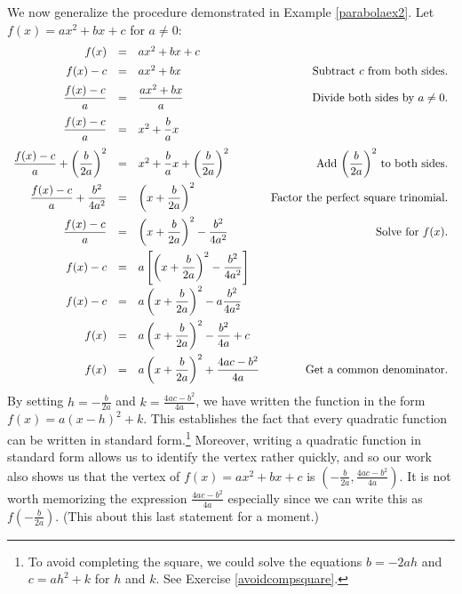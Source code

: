 
We now generalize the procedure demonstrated in Example \ref{parabolaex2}.  Let $f(x) = ax^2 + bx + c$ for $a \neq 0$: \[ \begin{array}{rclr}

f(x) & = & ax^2 + bx +c \\ [5pt]
f(x) - c & = &  ax^2 + bx & \text{Subtract $c$ from both sides.}\\ [5pt]
\dfrac{f(x)-c}{a}    & =  & \dfrac{ax^2 + bx}{a} &  \text{Divide both sides by $a \neq 0$.} \\ [10pt]
\dfrac{f(x)-c}{a}    & =  & x^2 + \dfrac{b}{a} x  & \\ [10pt]
\dfrac{f(x)-c}{a} + \left(\dfrac{b}{2a}\right)^2   & = & x^2 + \dfrac{b}{a} x + \left(\dfrac{b}{2a}\right)^2  & \text{Add $ \left(\dfrac{b}{2a}\right)^2  $ to both sides.}\\ [10pt]
\dfrac{f(x)-c}{a}  + \dfrac{b^2}{4a^2}    & = & \left(x + \dfrac{b}{2a}\right)^2  & \text{Factor the perfect square trinomial.} \\ [10pt]
\dfrac{f(x)-c}{a}    & =  & \left(x + \dfrac{b}{2a}\right)^2   -  \dfrac{b^2}{4a^2} & \text{Solve for $f(x)$.}\\ [10pt]
f(x)-c & = & a \left[ \left(x + \dfrac{b}{2a}\right)^2   -  \dfrac{b^2}{4a^2}\right] & \\ [10pt]
f(x)-c & = & a\left(x + \dfrac{b}{2a}\right)^2   -  a\dfrac{b^2}{4a^2} &  \\ [10pt]
f(x) & = & a\left(x + \dfrac{b}{2a}\right)^2 - \dfrac{b^2}{4a} + c  & \\ [10pt]
f(x) & = & a\left(x + \dfrac{b}{2a}\right)^2  + \dfrac{4ac - b^2}{4a}  & \text{Get a common denominator.} \\
    
\end{array}\] By setting $h = -\frac{b}{2a}$ and $k = \frac{4ac - b^2}{4a}$, we have written the function in the form $f(x) = a(x-h)^2 + k$.  This establishes the fact that every quadratic function can be written in standard form.\footnote{To avoid completing the square, we could solve the equations  $b = -2ah$ and $c = ah^2 + k $ for $h$ and $k$.  See Exercise \ref{avoidcompsquare}.}   Moreover, writing a quadratic function in standard form allows us to identify the vertex rather quickly, and so our work also shows us that the vertex of $f(x) = ax^2+bx+c$ is $\left(-\frac{b}{2a}, \frac{4ac - b^2}{4a}\right)$.  It is not worth memorizing the expression $\frac{4ac - b^2}{4a}$ especially since we can write this as $f\left(-\frac{b}{2a}\right)$.  (This about this last statement for a moment.)

